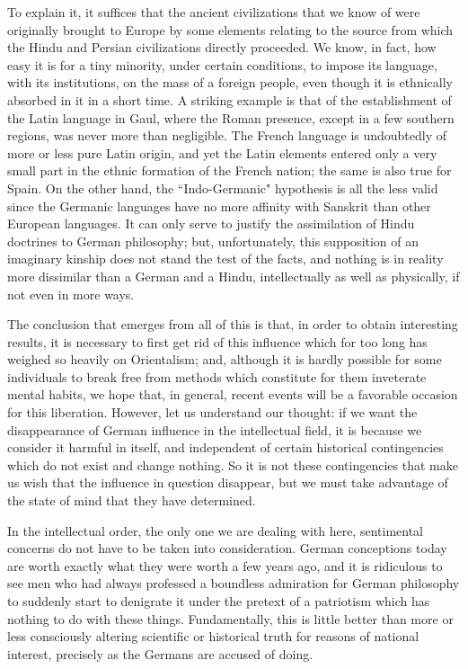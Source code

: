 To explain it, it suffices that the ancient civilizations that we know of were originally brought to Europe by some elements relating to the source from which the Hindu and Persian civilizations directly proceeded. We know, in fact, how easy it is for a tiny minority, under certain conditions, to impose its language, with its institutions, on the mass of a foreign people, even though it is ethnically absorbed in it in a short time. A striking example is that of the establishment of the Latin language in Gaul, where the Roman presence, except in a few southern regions, was never more than negligible. The French language is undoubtedly of more or less pure Latin origin, and yet the Latin elements entered only a very small part in the ethnic formation of the French nation; the same is also true for Spain. On the other hand, the ``Indo-Germanic" hypothesis is all the less valid since the Germanic languages \hspace{0pt}\hspace{0pt}have no more affinity with Sanskrit than other European languages. It can only serve to justify the assimilation of Hindu doctrines to German philosophy; but, unfortunately, this supposition of an imaginary kinship does not stand the test of the facts, and nothing is in reality more dissimilar than a German and a Hindu, intellectually as well as physically, if not even in more ways.

The conclusion that emerges from all of this is that, in order to obtain interesting results, it is necessary to first get rid of this influence which for too long has weighed so heavily on Orientalism; and, although it is hardly possible for some individuals to break free from methods which constitute for them inveterate mental habits, we hope that, in general, recent events will be a favorable occasion for this liberation. However, let us understand our thought: if we want the disappearance of German influence in the intellectual field, it is because we consider it harmful in itself, and independent of certain historical contingencies which do not exist and change nothing. So it is not these contingencies that make us wish that the influence in question disappear, but we must take advantage of the state of mind that they have determined.

In the intellectual order, the only one we are dealing with here, sentimental concerns do not have to be taken into consideration. German conceptions today are worth exactly what they were worth a few years ago, and it is ridiculous to see men who had always professed a boundless admiration for German philosophy to suddenly start to denigrate it under the pretext of a patriotism which has nothing to do with these things. Fundamentally, this is little better than more or less consciously altering scientific or historical truth for reasons of national interest, precisely as the Germans are accused of doing.

